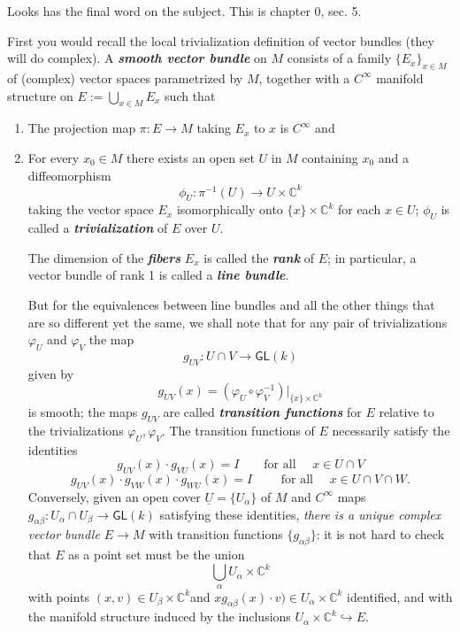 Looks \cite{gri} has the final word on the subject. This is chapter 0, sec. 5.

First you would recall the local trivialization definition of vector bundles (they will do complex). A \textit{\textbf{smooth vector bundle}} on \(M\) consists of a family \(\{E_{x}\}_{x \in M}\) of (complex) vector spaces parametrized by \(M\), together with a \(C^\infty\) manifold structure on \(E:= \bigcup_{x \in M}E_x\) such that
\begin{enumerate}
\item The projection map \(\pi:E \to M\) taking \(E_x\) to \(x\) is \(C^\infty\) and
\item For every \(x_0 \in M\) there exists an open set \(U\) in \(M\) containing \(x_0\) and a diffeomorphism
	\[\phi_U:\pi^{-1}(U)\longrightarrow U\times \mathbb{C}^k\]
taking the vector space \(E_x\) isomorphically onto \(\{x \}\times \mathbb{C}^k\) for each \(x \in U\); \(\phi_U\) is called a \textit{\textbf{trivialization}} of \(E\) over \(U\).

The dimension of the \textit{\textbf{fibers}} \(E_x\) is called the \textit{\textbf{rank}} of \(E\); in particular, a vector bundle of rank 1 is called a \textit{\textbf{line bundle}}.

But for the equivalences between line bundles and all the other things that are so different yet the same, we shall note that for any pair of trivializations \(\varphi_U\) and \(\varphi_V\) the map
\[g_{UV}:U \cap V \to \mathsf{GL}(k)\]
given by
\[g_{UV}(x)=(\varphi_U \circ \varphi_V^{-1})|_{\{x\}\times \mathbb{C}^k}\]
is smooth; the maps \(g_{UV}\) are called \textit{\textbf{transition functions}} for \(E\) relative to the trivializations \(\varphi_U, \varphi_V\). The transition functions of \(E\) necessarily satisfy the identities
\[g_{UV}(x)\cdot g_{VU}(x)=I\qquad \text{for all } \quad  x \in U \cap V\]
\[g_{UV}(x) \cdot g_{VW}(x) \cdot g_{WU}(x)=I\qquad \text{ for all } \quad  x \in U \cap V \cap W.\]
Conversely, given an open cover \(\underline{U}=\{U_\alpha\}\) of \(M\) and \(C^\infty\) maps \(g_{\alpha \beta}:U_\alpha \cap U_\beta \to \mathsf{GL}(k)\) satisfying these identities, \textit{there is a unique complex vector bundle \(E \to M\)} with transition functions \(\{g_{\alpha\beta}\}\): it is not hard to check that \(E\) as a point set must be the union
\[\bigcup_{\alpha}U_{\alpha}\times \mathbb{C}^k\]
with points  \((x,v) \in U_\beta \times \mathbb{C}^k\)and \(x g_{\alpha \beta}(x)\cdot v) \in U_\alpha \times \mathbb{C}^k\) identified, and with the manifold structure induced by the inclusions \(U_\alpha \times \mathbb{C}^k \hookrightarrow  E\).


\end{enumerate}
